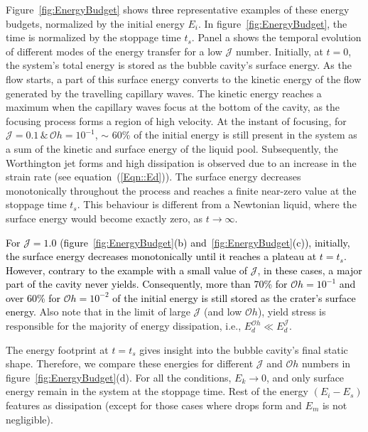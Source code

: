 \documentclass[final]{jfm}
\newcommand*\red{\textcolor{black}}
\begin{document}
Figure~\ref{fig:EnergyBudget} shows \red{three} representative examples of these energy budgets, normalized by the initial energy $E_i$. In figure~\ref{fig:EnergyBudget}, the time is normalized by the stoppage time $t_s$. Panel a shows the temporal evolution of different modes of the energy transfer for a low $\mathcal{J}$ number. 
Initially, at $t = 0$, the system's total energy is stored as the bubble cavity's surface energy. 
As the flow starts, a part of this surface energy converts to the kinetic energy of the flow generated by the travelling capillary waves. The kinetic energy reaches a maximum when the capillary waves focus at the bottom of the cavity, as the focusing process forms a region of high velocity. At the instant of focusing, for $\mathcal{J} = 0.1\,\&\,\mathcal{O}h = 10^{-1}$, $\sim$ 60\% of the initial energy is still present in the system as a sum of the kinetic and surface energy of the liquid pool. Subsequently, the Worthington jet forms and high dissipation is observed due to an increase in the strain rate (see equation~(\ref{Eqn::Ed})). The surface energy decreases monotonically throughout the process and reaches a finite near-zero value at the stoppage time $t_s$. This behaviour is different from a Newtonian liquid, where the surface energy would become exactly zero, as $t \to \infty$.

\red{For $\mathcal{J} = 1.0$ (figure~\ref{fig:EnergyBudget}(b) and~\ref{fig:EnergyBudget}(c)), initially, the surface energy decreases monotonically until it reaches a plateau at $t = t_s$. However, contrary to the example with a small value of $\mathcal{J}$, in these cases, a major part of the cavity never yields. Consequently, more than 70\% for $\mathcal{O}h =10^{-1}$ and over 60\% for $\mathcal{O}h =10^{-2}$ of the initial energy is still stored as the crater's surface energy.} Also note that in the limit of large $\mathcal{J}$ (and low $\mathcal{O}h$), yield stress is responsible for the majority of energy dissipation, i.e., $E_d^{\mathcal{O}h} \ll E_d^\mathcal{J}$.

The energy footprint at $t = t_s$ gives insight into the bubble cavity's final static shape. Therefore, we compare these energies for different $\mathcal{J}$ and $\mathcal{O}h$ numbers in figure~\ref{fig:EnergyBudget}(d). For all the conditions, $E_k \to 0$, and only surface energy remain in the system at the stoppage time. Rest of the energy $\left(E_i - E_s\right)$ features as dissipation (except for those cases where drops form and $E_m$ is not negligible). 
\end{document}

